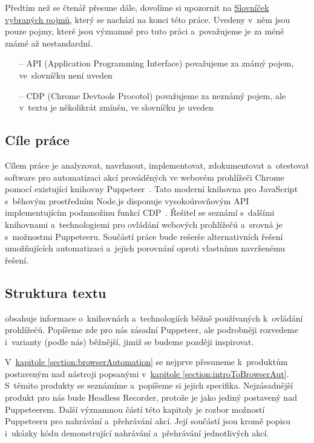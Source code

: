 \documentclass[12pt, a4paper, twoside]{article}
\begin{document}
	Předtím než se čtenář přesune dále, dovolíme si upozornit na \hyperref[glossary]{Slovníček vybraných pojmů}, který se nachází na konci této práce. Uvedeny v~něm jsou pouze pojmy, které jsou významné pro tuto práci a~považujeme je za méně známé až nestandardní.
	\begin{itemize}
		\item[--] API (Application Programming Interface) považujeme za známý pojem, ve~slovníčku není uveden
		\item[--] CDP (Chrome Devtools Procotol) považujeme za neznámý pojem, ale v~textu je několikrát zmíněn, ve slovníčku je uveden
	\end{itemize}
	\subsection{Cíle práce}
	Cílem práce je analyzovat, navrhnout, implementovat, zdokumentovat a~otestovat software pro automatizaci akcí prováděných ve webovém prohlížeči Chrome pomocí existující knihovny Puppeteer~\cite{puppeteerApi}.
	Tato moderní knihovna pro JavaScript s~běhovým prostředním Node.js disponuje vysokoúrovňovým API implementujícím podmnožinu funkcí CDP~\cite{devtoolsProtocol}.
	Řešitel se seznámí s~dalšími knihovnami a~technologiemi pro ovládání webových prohlížečů a~srovná je s~možnostmi Puppeteeru.
	Součástí práce bude rešerše alternativních řešení umožňujících automatizaci a~jejich porovnání oproti vlastnímu navrženému řešení.
	\subsection{Struktura textu}
	 obsahuje informace o~knihovnách a~technologiích běžně používaných k~ovládání prohlížečů. Popíšeme zde pro nás zásadní Puppeteer, ale podrobněji rozvedeme i~varianty (podle nás) běžnější, jimiž se budeme později inspirovat.
	
	V~\hyperref[section:browserAutomation]{kapitole \ref{section:browserAutomation}} se nejprve přesuneme k~produktům postaveným nad nástroji popsanými v~\hyperref[section:introToBrowserAut]{kapitole \ref{section:introToBrowserAut}}. S~těmito produkty se seznámíme a~popíšeme si jejich specifika. Nejzásadnější produkt pro nás bude Headless Recorder, protože je jako jediný postavený nad Puppeteerem. Další významnou částí této kapitoly je rozbor možností Puppeteeru pro nahrávání a~přehrávání akcí. Její součástí jsou kromě popisu i~ukázky kódu demonstrující nahrávání a~přehrávání jednotlivých akcí.
	
\end{document}
